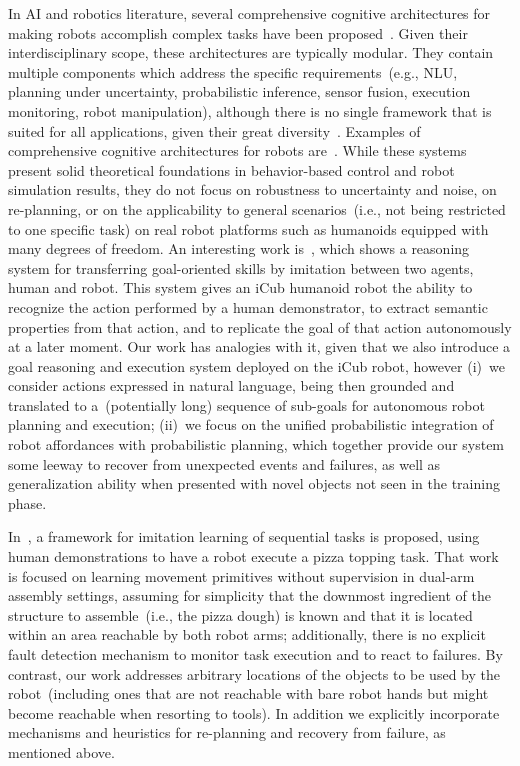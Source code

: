 In \ac{AI} and robotics literature, several comprehensive cognitive architectures for making robots accomplish complex tasks have been proposed~\cite{vernon:2016:bica}.
Given their interdisciplinary scope, these architectures are typically modular.
They contain multiple components which address the specific requirements~(e.g., \acs{NLU}, planning under uncertainty, probabilistic inference, sensor fusion, execution monitoring, robot manipulation), although there is no single framework that is suited for all applications, given their great diversity~\cite{beetz:2016:ai-reasoning}.
Examples of comprehensive cognitive architectures for robots are~\cite{py:2010:aamas,haazebroek:2011:cognprocess,sisbot:2012:tro,lemaignan:2017:ai,moulin-frier:2018:tcds}.
While these systems present solid theoretical foundations in behavior-based control and robot simulation results, they do not focus on robustness to uncertainty and noise, on re-planning, or on the applicability to general scenarios~(i.e., not being restricted to one specific task) on real robot platforms such as humanoids equipped with many degrees of freedom.
An interesting work is~\cite{ramirez-amaro:2015:ai}, which shows a reasoning system for transferring goal-oriented skills by imitation between two agents, human and robot.
This system gives an iCub humanoid robot the ability to recognize the action performed by a human demonstrator, to extract semantic properties from that action, and to replicate the goal of that action autonomously at a later moment.
Our work has analogies with it, given that we also introduce a goal reasoning and execution system deployed on the iCub robot, however
(i)~we consider actions expressed in natural language, being then grounded and translated to a~(potentially long) sequence of sub-goals for autonomous robot planning and execution;
(ii)~we focus on the unified probabilistic integration of robot affordances with probabilistic planning, which together provide our system some leeway to recover from unexpected events and failures, as well as generalization ability when presented with novel objects not seen in the training phase.

In~\cite{caccavale:2017:icdl}, a framework for imitation learning of sequential tasks is proposed, using human demonstrations to have a robot execute a pizza topping task.
That work is focused on learning movement primitives without supervision in dual-arm assembly settings, assuming for simplicity that the downmost ingredient of the structure to assemble~(i.e., the pizza dough) is known \apriori{} and that it is located within an area reachable by both robot arms; additionally, there is no explicit fault detection mechanism to monitor task execution and to react to failures.
By contrast, our work addresses arbitrary locations of the objects to be used by the robot~(including ones that are not reachable with bare robot hands but might become reachable when resorting to tools).
In addition we explicitly incorporate mechanisms and heuristics for re-planning and recovery from failure, as mentioned above.

